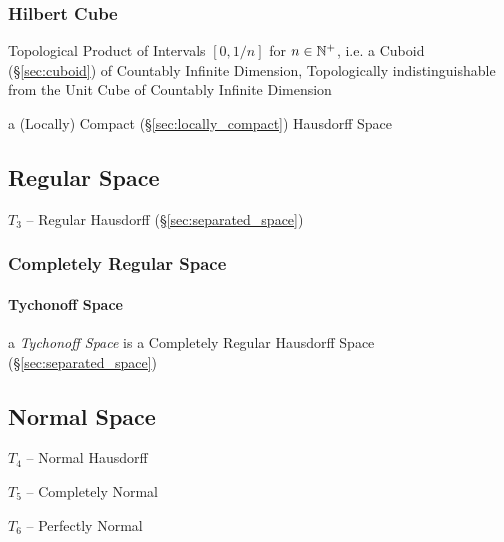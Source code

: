 \subsubsection{Hilbert Cube}\label{sec:hilbert_cube}

Topological Product of Intervals $[0, 1/n]$ for $n \in \mathbb{N}^+$, i.e. a Cuboid
(\S\ref{sec:cuboid}) of Countably Infinite Dimension, Topologically
indistinguishable from the Unit Cube of Countably Infinite Dimension

a (Locally) Compact (\S\ref{sec:locally_compact}) Hausdorff Space



\subsection{Regular Space}\label{sec:regular_space}

$\xspace{T}_3$ -- Regular Hausdorff (\S\ref{sec:separated_space})



\subsubsection{Completely Regular Space}\label{sec:completely_regular_space}

\paragraph{Tychonoff Space}\label{sec:completely_regular_space}

a \emph{Tychonoff Space} is a Completely Regular Hausdorff Space
(\S\ref{sec:separated_space})



\subsection{Normal Space}\label{sec:normal_space}

$\xspace{T}_4$ -- Normal Hausdorff

$\xspace{T}_5$ -- Completely Normal

$\xspace{T}_6$ -- Perfectly Normal



